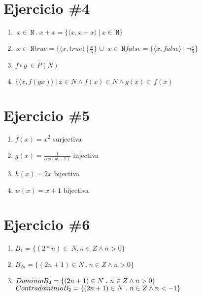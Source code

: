 \documentclass{article}
\begin{document}
\section*{Ejercicio \#4}
\begin{enumerate}
    \item $ \ x \in \ \mathtt{N} \ . \ x + x = \{ \langle x , x+x \rangle \ |\ x \in \ \mathtt{N} \} $
    \item $\ x \in \ \mathtt{N} true =\{ \langle x , true \rangle \ |\ \frac{x}{5}\} $ $\cup$ $ \ x \in \ \mathtt{N} false =\{ \langle x , false \rangle \ |\ \neg \frac{x}{5}\}$
    \item $f\circ g \ \in P(N)$
    \item $\{ \langle x, f(gx) \rangle \ |\ x \in N \wedge f(x) \in N   \wedge g(x) \subset f(x)$
\end{enumerate} 
\section*{Ejercicio \#5}
\begin{enumerate}

\item{$f(x)=x^2$} surjectiva 

        \item{$g(x)=\frac{1}{cos(x-1)}$} injectiva

        \item{$h(x)=2x$} bijectiva

        \item{$w(x)=x+1$} bijectiva
\end{enumerate}
\section*{Ejercicio \#6}
\begin{enumerate}
    \item $B_1 = \{ (2*n) \in \ N, n \in Z \wedge n > 0 \}$
    \item $B_{2a} = \{ (2n + 1) \in N \ . \ n \in Z \wedge n > 0 \}$
    \item $Dominio \\ B_2= \{ (2n+1) \in N \ . \ n \in Z \wedge n > 0 \}$ \\ $Contradominio \\ B_2 = \{ (2n+1) \in N \ . \ n \in Z \wedge n < -1 \} $
\end{enumerate}
\end{document}
